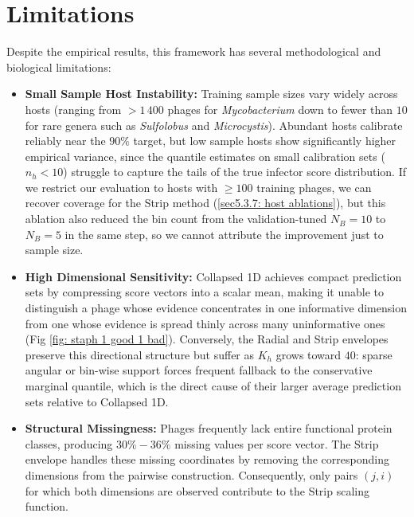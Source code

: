 \section{Limitations}
\label{sec6.2: limitations}

Despite the empirical results, this framework has several methodological and biological limitations:

\begin{itemize}
    \item \textbf{Small Sample Host Instability:} Training sample sizes vary widely across hosts (ranging from
          $>1\,400$ phages for \emph{Mycobacterium} down to fewer than $10$ for rare genera such as \emph{Sulfolobus}
          and \emph{Microcystis}). Abundant hosts calibrate reliably near the $90\%$ target, but low sample hosts
          show significantly higher empirical variance, since the quantile estimates on small calibration sets ($n_h < 10$)
          struggle to capture the tails of the true infector score distribution. If we restrict our evaluation to hosts
          with $\geq 100$ training phages, we can recover coverage for the Strip method (\ref{sec5.3.7: host ablations}), 
          but this ablation also reduced the bin count from the validation-tuned $N_B = 10$ to $N_B = 5$ in the same step, 
          so we cannot attribute the improvement just to sample size.
         
    \item \textbf{High Dimensional Sensitivity:} Collapsed 1D achieves compact prediction sets by 
          compressing score vectors into a scalar mean, making it unable to distinguish a phage whose evidence concentrates in 
          one informative dimension from one whose evidence is spread thinly across many uninformative ones (Fig \ref{fig: 
          staph 1 good 1 bad}). Conversely, the Radial and Strip envelopes preserve this directional structure but suffer as 
          $K_h$ grows toward $40$: sparse angular or bin-wise support forces frequent fallback to the conservative marginal 
          quantile, which is the direct cause of their larger average prediction sets relative to Collapsed 1D.

          \newpage
    \item \textbf{Structural Missingness:} Phages frequently lack entire functional protein classes, producing
           $30\%-36\%$ missing values per score vector. The Strip envelope handles these missing coordinates by removing the 
           corresponding dimensions from the pairwise construction. Consequently, only pairs $(j,i)$ for which both dimensions are
           observed contribute to the Strip scaling function.


\end{itemize}
